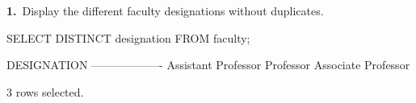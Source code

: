 \noindent\begin{minipage}{\linewidth}
\begingroup{}
{\fontsize{14}{17}\selectfont\textbf{1.}}\ Display the different faculty designations without duplicates.\par
\endgroup\vspace{12pt}


\begin{sqlcode}
SELECT DISTINCT designation FROM faculty;
\end{sqlcode}

\vspace{18pt}


\begin{sqlout}[fontsize=\small]
DESIGNATION        
-------------------
Assistant Professor
Professor
Associate Professor

3 rows selected.
\end{sqlout}
\end{minipage}\par\vspace{24pt}

